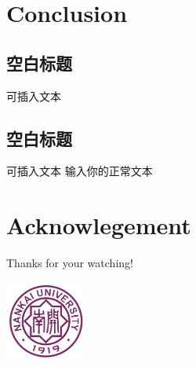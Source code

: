 \documentclass{beamer}
\begin{document}
\section{Conclusion}
\subsection{空白标题}
\begin{frame}{可插入文本}
\end{frame}

\subsection{空白标题}
    \begin{frame}{可插入文本}
    输入你的正常文本
    \end{frame}



\section{Acknowlegement}

    \begin{frame}
        \huge{\centerline{Thanks for your watching!}}
        \vfill
        \centering
            \includegraphics[width=0.2\textwidth]{image.png}
            \label{fig:final}
    \end{frame}

    
\end{document}
